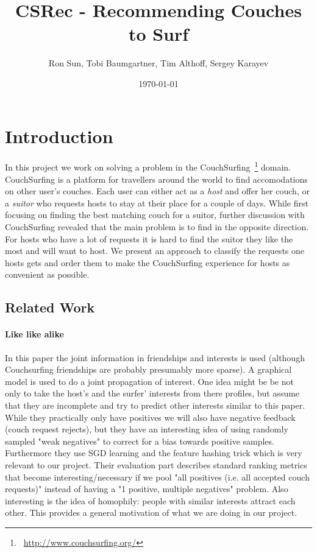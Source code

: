 \documentclass[11pt]{article}
\title{CSRec - Recommending Couches to Surf}
\author{Ron Sun, Tobi Baumgartner, Tim Althoff, Sergey Karayev}
\date{\today}
\begin{document}
\maketitle

\section{Introduction}
In this project we work on solving a problem in the CouchSurfing~\footnote{~\url{http://www.couchsurfing.org/}} domain. CouchSurfing is a platform for travellers around the world to find accomodations on other user's couches. Each user can either act as a \textit{host} and offer her couch, or a \textit{suitor} who requests hosts to stay at their place for a couple of days. While first focusing on finding the best matching couch for a suitor, further discussion with CouchSurfing revealed that the main problem is to find in the opposite direction. For hosts who have a lot of requests it is hard to find the suitor they like the most and will want to host. We present an approach to classify the requests one hosts gets and order them to make the CouchSurfing experience for hosts as convenient as possible. 

\subsection{Related Work}


\paragraph{Like like alike} \cite{Yang2011}
In this paper the joint information in friendships and interests is used (although Couchsurfing friendships are probably presumably more sparse).
A graphical model is used to do a joint propagation of interest.
One idea might be be not only to take the host's and the surfer' interests from there profiles, but assume that they are incomplete and try to predict other interests similar to this paper. While they practically only have positives we will also have negative feedback (couch request rejects), but they have an interesting idea of using randomly sampled "weak negatives" to correct for a bias towards positive samples.
Furthermore they use SGD learning and the feature hashing trick which is very relevant to our project.
Their evaluation part describes standard ranking metrics that become interesting/necessary if we pool "all positives (i.e. all accepted couch requests)" instead of having a "1 positive, multiple negatives" problem.
Also interesting is the idea of homophily: people with similar interests attract each other. This provides a general motivation of what we are doing in our project.
\end{document}
